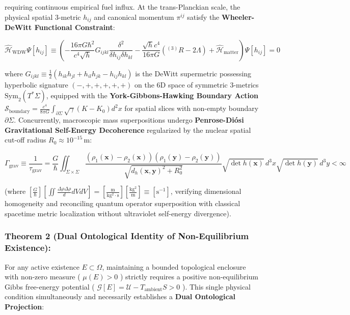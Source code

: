 \documentclass[11pt,a4paper]{article}
\theoremstyle{definition}
\theoremstyle{remark}
\begin{document}
requiring continuous empirical fuel influx. At the trans-Planckian scale, the physical spatial 3-metric $h_{ij}$ and canonical momentum $\pi^{ij}$ satisfy the \textbf{Wheeler-DeWitt Functional Constraint}:


\begin{equation}
\boxed{\hat{\mathcal{H}}_{\text{WDW}} \Psi[h_{ij}] \equiv \left( -\frac{16\pi G \hbar^2}{c^4 \sqrt{h}} G_{ijkl} \frac{\delta^2}{\delta h_{ij} \delta h_{kl}} - \frac{\sqrt{h} c^4}{16\pi G} \left( {}^{(3)}R - 2\Lambda \right) + \hat{\mathcal{H}}_{\text{matter}} \right) \Psi[h_{ij}] = 0}
\end{equation}


where $G_{ijkl} \equiv \frac{1}{2}(h_{ik}h_{jl} + h_{il}h_{jk} - h_{ij}h_{kl})$ is the DeWitt supermetric possessing hyperbolic signature $(-, +, +, +, +, +)$ on the 6D space of symmetric 3-metrics $\mathrm{Sym}_2(T^*\Sigma)$, equipped with the \textbf{York-Gibbons-Hawking Boundary Action} $\mathcal{S}_{\text{boundary}} = \frac{c^4}{8\pi G}\int_{\partial\Sigma} \sqrt{\gamma}(K - K_0) d^2x$ for spatial slices with non-empty boundary $\partial\Sigma$. Concurrently, macroscopic mass superpositions undergo \textbf{Penrose-Diósi Gravitational Self-Energy Decoherence} regularized by the nuclear spatial cut-off radius $R_0 \approx 10^{-15} \, \mathrm{m}$:


\begin{equation}
\boxed{\Gamma_{\text{grav}} \equiv \frac{1}{\tau_{\text{grav}}} = \frac{G}{\hbar} \iint_{\Sigma \times \Sigma} \frac{\left( \rho_1(\mathbf{x}) - \rho_2(\mathbf{x}) \right) \left( \rho_1(\mathbf{y}) - \rho_2(\mathbf{y}) \right)}{\sqrt{d_h(\mathbf{x}, \mathbf{y})^2 + R_0^2}} \sqrt{\det h(\mathbf{x})} \, d^3x \sqrt{\det h(\mathbf{y})} \, d^3y < \infty}
\end{equation}


(where $[\frac{G}{\hbar}][\iint \frac{\Delta\rho\Delta\rho}{d} dV dV] = [\frac{\mathrm{m}}{\mathrm{kg^2 \cdot s}}][\frac{\mathrm{kg^2}}{\mathrm{m}}] \equiv [\mathrm{s^{-1}}]$, verifying dimensional homogeneity and reconciling quantum operator superposition with classical spacetime metric localization without ultraviolet self-energy divergence).

\subsubsection{Theorem 2 (Dual Ontological Identity of Non-Equilibrium Existence):}
For any active existence $E \subset \Omega$, maintaining a bounded topological enclosure with non-zero measure ( $\mu(E) > 0$ ) strictly requires a positive non-equilibrium Gibbs free-energy potential ( $\mathcal{G}[E] = \mathcal{U} - T_{\text{ambient}} S > 0$ ). This single physical condition simultaneously and necessarily establishes a \textbf{Dual Ontological Projection}:
\end{document}
